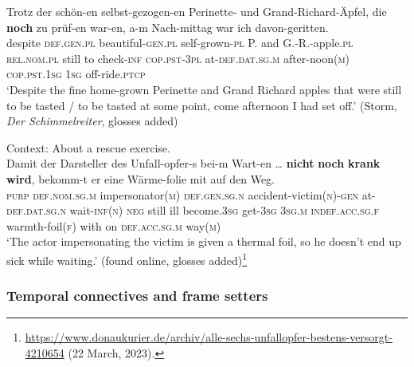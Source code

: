 \begin{exe}
	\ex\label{exAppendixGermanProspective5}	
	\gll Trotz der schön-en selbst-gezogen-en Perinette- und Grand-Richard-Äpfel, die \textbf{noch} zu prüf-en war-en, a-m Nach-mittag war ich davon-geritten.\\
	despite \textsc{def}.\textsc{gen}.\textsc{pl} beautiful-\textsc{gen}.\textsc{pl} self-grown-\textsc{pl} P. and G.-R.-apple.\textsc{pl} \textsc{rel}.\textsc{nom}.\textsc{pl} still to check-\textsc{inf} \textsc{cop}.\textsc{pst}-3\textsc{pl} at-\textsc{def}.\textsc{dat}.\textsc{sg}.\textsc{m} after-noon(\textsc{m}) \textsc{cop}.\textsc{pst}.1\textsc{sg} 1\textsc{sg} off-ride.\textsc{ptcp}\\
	\glt \lq Despite the fine home-grown Perinette and Grand Richard apples that were still to be tasted / to be tasted at some point, come afternoon I had set off.' (Storm, \textit{Der Schimmelreiter}, glosses added)
	
	\ex  Context: About a rescue exercise.\label{exAppendixGermanProspective6}\\
	\gll Damit der Darsteller des Unfall-opfer-s bei-m Wart-en … \textbf{nicht} \textbf{noch} \textbf{krank} \textbf{wird}, bekomm-t er eine Wärme-folie mit auf den Weg.	\\
	\textsc{purp} \textsc{def}.\textsc{nom}.\textsc{sg}.\textsc{m} impersonator(\textsc{m}) \textsc{def}.\textsc{gen}.\textsc{sg}.\textsc{n} accident-victim(\textsc{n})-\textsc{gen} at-\textsc{def}.\textsc{dat}.\textsc{sg}.\textsc{n} wait-\textsc{inf}(\textsc{n}) {}
	 \textsc{neg} still ill become.3\textsc{sg} get-3\textsc{sg} 3\textsc{sg}.\textsc{m} \textsc{indef}.\textsc{acc}.\textsc{sg}.\textsc{f} warmth-foil(\textsc{f}) with on \textsc{def}.\textsc{acc}.\textsc{sg}.\textsc{m} way(\textsc{m})\\
	\glt \lq The actor impersonating the victim is given a thermal foil, so he doesn't end up sick while waiting.\rq{ }(found online, glosses added)\footnote{\url{https://www.donaukurier.de/archiv/alle-sechs-unfallopfer-bestens-versorgt-4210654} (22 March, 2023).}
\end{exe}



\subsubsection{Temporal connectives and frame setters}
